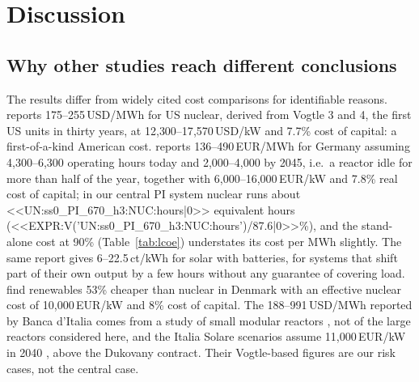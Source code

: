 \section{Discussion}\label{sec:discussion}

\subsection{Why other studies reach different conclusions}
The results differ from widely cited cost comparisons for identifiable reasons. \citet{Lazard2025} reports 175--255\,USD/MWh for US nuclear, derived from Vogtle 3 and 4, the first US units in thirty years, at 12{,}300--17{,}570\,USD/kW and 7.7\% cost of capital: a first-of-a-kind American cost. \citet{Fraunhofer2024} reports 136--490\,EUR/MWh for Germany assuming 4{,}300--6{,}300 operating hours today and 2{,}000--4{,}000 by 2045, i.e.\ a reactor idle for more than half of the year, together with 6{,}000--16{,}000\,EUR/kW and 7.8\% real cost of capital; in our central PI system nuclear runs about <<UN:ss0_PI_670_h3:NUC:hours|0>> equivalent hours (<<EXPR:V('UN:ss0_PI_670_h3:NUC:hours')/87.6|0>>\%), and the stand-alone cost at 90\% (Table~\ref{tab:lcoe}) understates its cost per MWh slightly. The same report gives 6--22.5\,ct/kWh for solar with batteries, for systems that shift part of their own output by a few hours without any guarantee of covering load. \citet{Lund2026} find renewables 53\% cheaper than nuclear in Denmark with an effective nuclear cost of 10{,}000\,EUR/kW and 8\% cost of capital. The 188--991\,USD/MWh reported by Banca d'Italia \citep{Bankitalia2025} comes from a study of small modular reactors \citep{Steigerwald2023}, not of the large reactors considered here, and the Italia Solare scenarios assume 11{,}000\,EUR/kW in 2040 \citep{ItaliaSolare2026}, above the Dukovany contract. Their Vogtle-based figures are our risk cases, not the central case.

